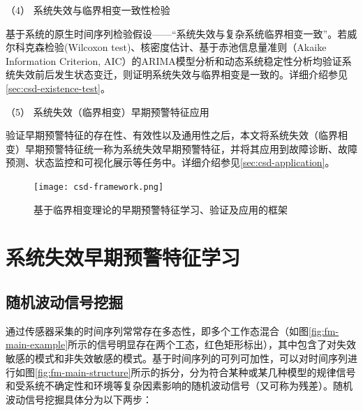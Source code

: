 （4） 系统失效与临界相变一致性检验

基于系统的原生时间序列检验假设——“系统失效与复杂系统临界相变一致”。若威尔科克森检验(Wilcoxon test)\cite{bisgaard2011time}、核密度估计\cite{bisgaard2011time}、基于赤池信息量准则（Akaike Information Criterion, AIC）的ARIMA模型分析和动态系统稳定性分析\cite{brunton2016discovering}均验证系统失效前后发生状态变迁，则证明系统失效与临界相变是一致的。详细介绍参见\ref{sec:csd-existence-test}。

（5） 系统失效（临界相变）早期预警特征应用

验证早期预警特征的存在性、有效性以及通用性之后，本文将系统失效（临界相变）早期预警特征统一称为{\heiti 系统失效早期预警特征}，并将其应用到故障诊断、故障预测、状态监控和可视化展示等任务中。详细介绍参见\ref{sec:csd-application}。

\begin{figure}[H]
\centering
\texttt{[image: csd-framework.png]}
\caption{基于临界相变理论的早期预警特征学习、验证及应用的框架}
\label{fig:csd-framework}
\end{figure}

\section{系统失效早期预警特征学习}
\label{sec:csd-feature}

\subsection{随机波动信号挖掘}
\label{sec:fluctuation-mining}

通过传感器采集的时间序列常常存在多态性，即多个工作态混合（如图\ref{fig:fm-main-example}所示的信号明显存在两个工态，红色矩形标出），其中包含了对失效敏感的模式和非失效敏感的模式。基于时间序列的可列可加性，可以对时间序列进行如图\ref{fig:fm-main-structure}所示的拆分，分为符合某种或某几种模型的规律信号和受系统不确定性和环境等复杂因素影响的随机波动信号（又可称为残差）。随机波动信号挖掘具体分为以下两步：

